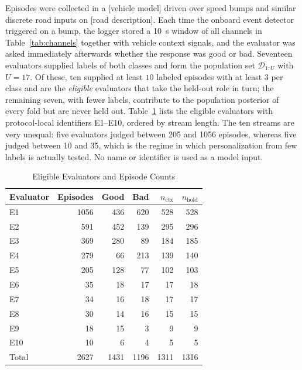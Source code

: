\documentclass[lettersize,journal]{IEEEtran}
\newif\ifdraftnotes
\newcommand{\draftnote}[1]{\ifdraftnotes\textcolor{red}{\textbf{[TODO: #1]}}\fi}
\newcommand{\D}{\mathcal{D}}
\begin{document}
Episodes were collected in a [vehicle model] driven over speed bumps and similar discrete road inputs on [road description]. Each time the onboard event detector triggered on a bump, the logger stored a 10~s window of all channels in Table~\ref{tab:channels} together with vehicle context signals, and the evaluator was asked immediately afterwards whether the response was good or bad. \draftnote{State the full catalog size (episodes and evaluators, labeled and unlabeled); these counts are not part of the frozen run artifacts and must come from the catalog. Confirm that the stored label \texttt{True} denotes a good response, as assumed throughout (the negative population coefficient on vertical peak-to-peak acceleration is consistent with this reading).} Seventeen evaluators supplied labels of both classes and form the population set $\D_{1:U}$ with $U=17$. Of these, ten supplied at least $10$ labeled episodes with at least $3$ per class and are the \emph{eligible} evaluators that take the held-out role in turn; the remaining seven, with fewer labels, contribute to the population posterior of every fold but are never held out. Table~\ref{tab:data} lists the eligible evaluators with protocol-local identifiers E1--E10, ordered by stream length. The ten streams are very unequal: five evaluators judged between 205 and 1056 episodes, whereas five judged between 10 and 35, which is the regime in which personalization from few labels is actually tested. No name or identifier is used as a model input.

\begin{table}[t]
\caption{Eligible Evaluators and Episode Counts}
\label{tab:data}
\centering
\setlength{\tabcolsep}{5pt}
\begin{tabular}{lrrrrr}
\toprule
Evaluator & Episodes & Good & Bad & $n_{\mathrm{ctx}}$ & $n_{\mathrm{hold}}$ \\
\midrule
E1  & 1056 & 436 & 620 & 528 & 528 \\
E2  &  591 & 452 & 139 & 295 & 296 \\
E3  &  369 & 280 &  89 & 184 & 185 \\
E4  &  279 &  66 & 213 & 139 & 140 \\
E5  &  205 & 128 &  77 & 102 & 103 \\
E6  &   35 &  18 &  17 &  17 &  18 \\
E7  &   34 &  16 &  18 &  17 &  17 \\
E8  &   30 &  14 &  16 &  15 &  15 \\
E9  &   18 &  15 &   3 &   9 &   9 \\
E10 &   10 &   6 &   4 &   5 &   5 \\
\midrule
Total & 2627 & 1431 & 1196 & 1311 & 1316 \\
\bottomrule
\end{tabular}
\\[2pt]
\draftnote{State recruitment, demographics, vehicle settings, road protocol, feedback interface and timing, consent, and the ethics determination with its identifier. Seven further evaluators with fewer labels are in the population set only.}
\end{table}
\end{document}
